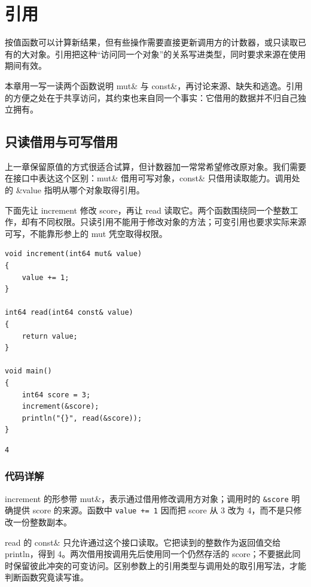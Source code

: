 \chapter{引用}
\label{ch:07}

按值函数可以计算新结果，但有些操作需要直接更新调用方的计数器，或只读取已有的大对象。引用把这种“访问同一个对象”的关系写进类型，同时要求来源在使用期间有效。

本章用一写一读两个函数说明 mut\& 与 const\&，再讨论来源、缺失和逃逸。引用的方便之处在于共享访问，其约束也来自同一个事实：它借用的数据并不归自己独立拥有。

\section{只读借用与可写借用}

上一章保留原值的方式很适合试算，但计数器加一常常希望修改原对象。我们需要在接口中表达这个区别：mut\& 借用可写对象，const\& 只借用读取能力。调用处的 \&value 指明从哪个对象取得引用。

下面先让 increment 修改 score，再让 read 读取它。两个函数围绕同一个整数工作，却有不同权限。只读引用不能用于修改对象的方法；可变引用也要求实际来源可写，不能靠形参上的 mut 凭空取得权限。

\par
\medskip
\begin{lstlisting}[style=chali]
void increment(int64 mut& value)
{
    value += 1;
}

int64 read(int64 const& value)
{
    return value;
}

void main()
{
    int64 score = 3;
    increment(&score);
    println("{}", read(&score));
}
\end{lstlisting}
\par
\medskip

\par
\medskip
\begin{lstlisting}[style=out]
4
\end{lstlisting}
\par
\medskip

\subsection*{代码详解}

increment 的形参带 mut\&，表示通过借用修改调用方对象；调用时的 \texttt{\&score} 明确提供 score 的来源。函数中 \texttt{value +=\allowbreak{} 1} 因而把 score 从 3 改为 4，而不是只修改一份整数副本。

read 的 const\& 只允许通过这个接口读取。它把读到的整数作为返回值交给 println，得到 4。两次借用按调用先后使用同一个仍然存活的 score；不要据此同时保留彼此冲突的可变访问。区别参数上的引用类型与调用处的取引用写法，才能判断函数究竟读写谁。

